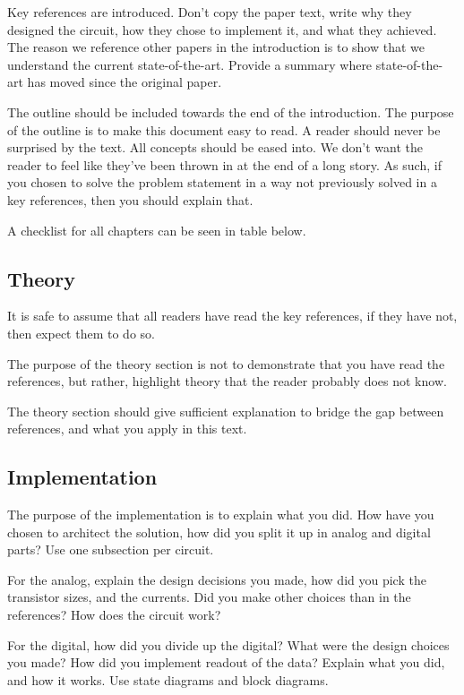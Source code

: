 Key references are introduced. Don't copy the paper text, write why they
designed the circuit, how they chose to implement it, and what they
achieved. The reason we reference other papers in the introduction is to
show that we understand the current state-of-the-art. Provide a summary
where state-of-the-art has moved since the original paper.

The outline should be included towards the end of the introduction. The
purpose of the outline is to make this document easy to read. A reader
should never be surprised by the text. All concepts should be eased
into. We don't want the reader to feel like they've been thrown in at
the end of a long story. As such, if you chosen to solve the problem
statement in a way not previously solved in a key references, then you
should explain that.

A checklist for all chapters can be seen in table below.

\subsection{Theory}\label{theory}

It is safe to assume that all readers have read the key references, if
they have not, then expect them to do so.

The purpose of the theory section is not to demonstrate that you have
read the references, but rather, highlight theory that the reader
probably does not know.

The theory section should give sufficient explanation to bridge the gap
between references, and what you apply in this text.

\subsection{Implementation}\label{implementation}

The purpose of the implementation is to explain what you did. How have
you chosen to architect the solution, how did you split it up in analog
and digital parts? Use one subsection per circuit.

For the analog, explain the design decisions you made, how did you pick
the transistor sizes, and the currents. Did you make other choices than
in the references? How does the circuit work?

For the digital, how did you divide up the digital? What were the design
choices you made? How did you implement readout of the data? Explain
what you did, and how it works. Use state diagrams and block diagrams.

